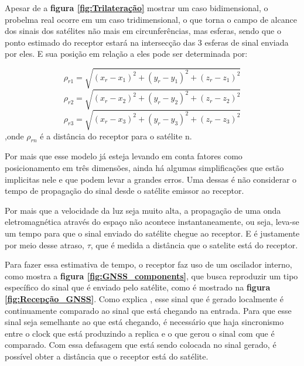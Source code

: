 Apesar de a \textbf{figura \ref{fig:Trilateração}} mostrar um caso bidimensional, o probelma real ocorre em um caso tridimensional, o que torna o campo de alcance dos sinais dos satélites não mais em circunferências, mas esferas, sendo que o ponto estimado do receptor estará na intersecção das 3 esferas de sinal enviada por eles. E sua posição em relação a eles pode ser determinada por:

\begin{equation}
    \rho_{r1} =\sqrt{(x_r-x_1)^2+(y_r-y_1)^2+(z_r-z_1)^2}
\end{equation}
\begin{equation}
    \rho_{r2} =\sqrt{(x_r-x_2)^2+(y_r-y_2)^2+(z_r-z_2)^2}
\end{equation}
\begin{equation}
    \rho_{r3} =\sqrt{(x_r-x_3)^2+(y_r-y_3)^2+(z_r-z_3)^2}
\end{equation}
,onde $\rho_{rn}$ é a distância do receptor para o satélite n.

Por mais que esse modelo já esteja levando em conta fatores como posicionamento em três dimensões, ainda há algumas simplificações que estão implicitas nele e que podem levar a grandes erros. Uma dessas é não considerar o tempo de propagação do sinal desde o satélite emissor ao receptor.

Por mais que a velocidade da luz seja muito alta, a propagação de uma onda eletromagnética através do espaço não acontece instantaneamente, ou seja, leva-se um tempo para que o sinal enviado do satélite chegue ao receptor. E é justamente por meio desse atraso, $\tau$, que é medida a distância que o satelite está do receptor. 

Para fazer essa estimativa de tempo, o receptor faz uso de um oscilador interno, como mostra a \textbf{figura \ref{fig:GNSS_components}}, que busca reproduzir um tipo específico do sinal que é enviado pelo satélite, como é mostrado na \textbf{figura \ref{fig:Recepção_GNSS}}. Como explica \cite{Teunissen2017}, esse sinal que é gerado localmente é continuamente comparado ao sinal que está chegando na entrada. Para que esse sinal seja semelhante ao que está chegando, é necessário que haja sincronismo entre o clock que está produzindo a replica e o que gerou o sinal com que é comparado. Com essa defasagem que está sendo colocada no sinal gerado, é possível obter a distância que o receptor está do satélite.


